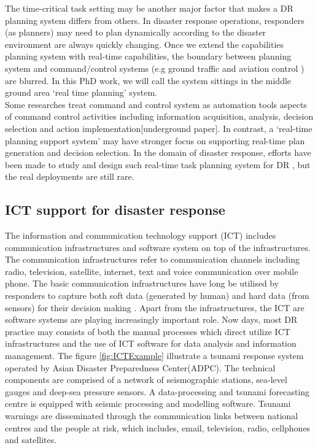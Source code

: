 The time-critical task setting may be another major factor that makes a DR planning system differs from others. In disaster response operations, responders (as planners) may need to plan dynamically according to the disaster environment are always quickly changing. Once we extend the capabilities planning system with real-time capabilities, the boundary between planning system and command/control systems (e.g ground traffic and aviation control \cite{Sharples2011}) are blurred. In this PhD work, we will call the system sittings in the middle ground area `real time planning' system.\\

Some researches treat command and control system as automation tools aspects of command control activities including information acquisition, analysis, decision selection and action implementation[underground paper].  In contrast, a `real-time planning support system' may have stronger focus on supporting real-time plan generation and decision selection. In the domain of disaster response, efforts have been made to study and design such real-time task planning system for DR \cite{Wagner2004,Okaya}, but the real deployments are still rare.\\

\subsection{ICT support for disaster response}
The information and communication technology support (ICT) includes communication infrastructures and software system on top of the infrastructures. The communication infrastructures refer to communication channels including radio, television, satellite, internet, text and voice communication over mobile phone. The basic communication infrastructures have long be utilised by responders to capture both soft data (generated by human) and hard data (from sensors) for their decision making \cite{Fischer2012}. Apart from the infrastructures, the ICT are  software systems are playing increasingly important role. Now days, most DR practice may consists  of both the manual processes which direct utilize ICT infrastructures and the use of ICT software for data analysis and information management. The figure \ref{fig:ICTExample} illustrate a tsunami response system operated by Asian Disaster Preparedness Center(ADPC). The technical components are comprised of a network of seismographic stations, sea-level gauges and deep-sea pressure sensors. A data-processing and tsunami forecasting centre is equipped with seismic processing and modelling software.  Tsunami warnings are disseminated through the communication links between national centres and the people at risk, which includes, email, television, radio, cellphones and satellites.\\

